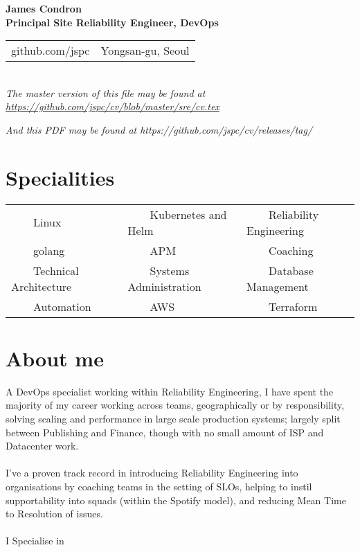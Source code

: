 \documentclass[11pt,a4paper,sans]{article}
\newcommand{\tabitem}{~~\llap{\textbullet}~~}
\begin{document}
\begin{center}
  {\huge\textbf{James Condron}}\\
  \textbf{Principal Site Reliability Engineer, DevOps} \\

  \begin{tabular}{rl}
    github.com/jspc & Yongsan-gu, Seoul
  \end{tabular} \\

  {\footnotesize\textit{The master version of this file may be found at \url{https://github.com/jspc/cv/blob/master/sre/cv.tex}}}

  {\footnotesize\textit{And this PDF may be found at https://github.com/jspc/cv/releases/tag/}}%
  {}

\end{center}

\section{Specialities}
\begin{tabular}{lll}
  \tabitem Linux & \tabitem Kubernetes and Helm & \tabitem Reliability Engineering \\
  \tabitem golang & \tabitem APM & \tabitem Coaching \\
  \tabitem Technical Architecture & \tabitem Systems Administration & \tabitem Database Management \\
  \tabitem Automation & \tabitem AWS & \tabitem Terraform  \\
\end{tabular}

\section{About me}
A DevOps specialist working within Reliability Engineering, I have spent the majority of my career working across teams, geographically or by responsibility, solving scaling and performance in large scale production systems; largely split between Publishing and Finance, though with no small amount of ISP and Datacenter work. \\
\\
I've a proven track record in introducing Reliability Engineering into organisations by coaching teams in the setting of SLOs, helping to instil supportability into squads (within the Spotify model), and reducing Mean Time to Resolution of issues. \\
\\
I Specialise in
\end{document}
